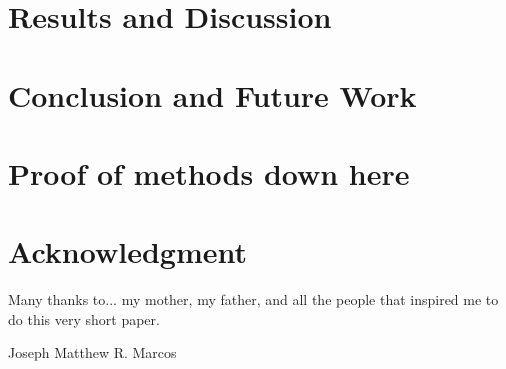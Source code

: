 \documentclass[journal]{./IEEE/IEEEtran}
\newcommand{\ADVISEE}{Joseph Matthew R. Marcos}
\begin{document}
\section{Results and Discussion}
\section{Conclusion and Future Work}
\appendices

\section{Proof of methods down here}

\section{}

\section*{Acknowledgment}
Many thanks to... my mother, my father, and all the people that inspired me to do this very short paper.

\begin{biography}{\ADVISEE}
\end{biography}


\newpage
% 


\end{document}
